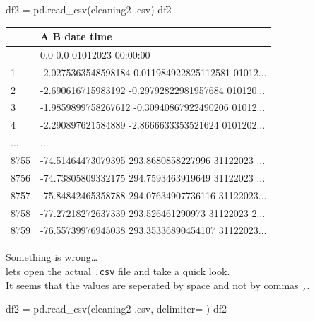 \documentclass[
  letterpaper,
  DIV=11,
  numbers=noendperiod,
  oneside]{scrreprt}
\newenvironment{Shaded}{\begin{snugshade}}{\end{snugshade}}
\newcommand{\NormalTok}[1]{\textcolor[rgb]{0.00,0.23,0.31}{#1}}
\newcommand{\OperatorTok}[1]{\textcolor[rgb]{0.37,0.37,0.37}{#1}}
\newcommand{\StringTok}[1]{\textcolor[rgb]{0.13,0.47,0.30}{#1}}
\begin{document}
\begin{Shaded}
\begin{Highlighting}[]
\NormalTok{df2 }\OperatorTok{=}\NormalTok{ pd.read\_csv(}\StringTok{\textquotesingle{}cleaning2{-}.csv\textquotesingle{}}\NormalTok{)}
\NormalTok{df2}
\end{Highlighting}
\end{Shaded}

\begin{longtable}[]{@{}ll@{}}
\toprule\noalign{}
& A B date time \\
\midrule\noalign{}
\endhead
\bottomrule\noalign{}
\endlastfoot
0 & 0.0 0.0 01012023 00:00:00 \\
1 & -2.0275363548598184 0.011984922825112581 01012... \\
2 & -2.690616715983192 -0.29792822981957684 010120... \\
3 & -1.9859899758267612 -0.30940867922490206 01012... \\
4 & -2.290897621584889 -2.8666633353521624 0101202... \\
... & ... \\
8755 & -74.51464473079395 293.8680858227996 31122023 ... \\
8756 & -74.73805809332175 294.7593463919649 31122023 ... \\
8757 & -75.84842465358788 294.07634907736116 31122023... \\
8758 & -77.27218272637339 293.526461290973 31122023 2... \\
8759 & -76.55739976945038 293.35336890454107 31122023... \\
\end{longtable}

Something is wrong\ldots{}\\
lets open the actual \texttt{.csv} file and take a quick look.\\
It seems that the values are seperated by space and not by commas
\texttt{,}.

\begin{Shaded}
\begin{Highlighting}[]
\NormalTok{df2 }\OperatorTok{=}\NormalTok{ pd.read\_csv(}\StringTok{\textquotesingle{}cleaning2{-}.csv\textquotesingle{}}\NormalTok{, delimiter}\OperatorTok{=}\StringTok{\textquotesingle{} \textquotesingle{}}\NormalTok{)}
\NormalTok{df2}
\end{Highlighting}
\end{Shaded}
\end{document}
